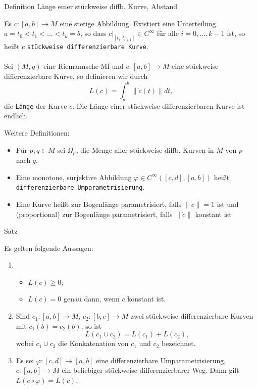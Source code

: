 \documentclass[a6paper,11pt,grid=front]{kartei}
\newcommand{\fl}[1]{\begin{flushleft}
 #1 \end{flushleft}}
\newcounter{def}
\begin{document}
\nonameyet
{\tiny Definition} {\tiny Länge einer stückweise diffb. Kurve, Abstand}
{
\scriptsize
Es $c: [a,b] \to M$ eine stetige Abbildung. 
Existiert eine Unterteilung $a = t_0 < t_1 < \dots < t_k = b$, so dass
$c|_{[t_i,t_{i+1}]} \in C^\infty$ für alle $i = 0,\dots, k-1$ ist,
so heißt $c$ \texttt{stückweise differenzierbare Kurve}.
\\
~\\
Sei $(M,g)$ eine Riemannsche Mf und $c : [a,b] \to M$ eine stückweise
differenzierbare Kurve, so definieren wir durch
\[
L(c) = \int_a^b \| \dot c(t) \| dt,
\]
die \texttt{Länge} der Kurve $c$. 
Die Länge einer stückweise differenzierbaren Kurve ist endlich.
\fl{Weitere Definitionen:}
\begin{itemize}[-]
\item Für $p,q \in M$ sei $\Omega_{pq}$ die Menge aller stückweise
			diffb. Kurven in $M$ von $p$ nach $q$.  
\item %
Eine monotone, surjektive Abbildung $\varphi \in C^\infty([c,d],[a,b])$ heißt
		\texttt{differenzierbare Umparametrisierung}.
\item %
Eine Kurve heißt zur Bogenlänge parametrisiert, falls
$\| \dot c \|  = 1$ ist und (proportional) zur Bogenlänge parametrisiert,
falls $\| \dot c \|$ konstant ist
\end{itemize}
}
{}

\nonameyet
{Satz} {}
{
	\small
\fl{Es gelten folgende Aussagen:}
\begin{enumerate}[1.]
\item 
\begin{itemize}
\item $L(c) \geq 0$; 
\item $L(c) = 0$ genau dann, wenn $c$ konstant ist.
\end{itemize}
%
\item Sind $c_1 : [a,b] \to M$, $c_2 : [b,c] \to  M$ zwei stückweise
differenzierbare Kurven mit $c_1(b) = c_2(b)$, so ist 
$$L(c_1 \cup c_2) = L(c_1) + L(c_2),$$ 
wobei $c_1 \cup c_2$ die Konkatenation von $c_1$ und $c_2$ bezeichnet.
\item Es sei $\varphi : [c,d] \to [a,b]$ eine differenzierbare 
Umparametrisierung, 
\\ $c : [a,b] \to M$ ein beliebiger stückweise 
differenzierbarer Weg.
Dann gilt  $L (c \circ \varphi) = L (c)$.
\end{enumerate}
}
{}
\end{document}
